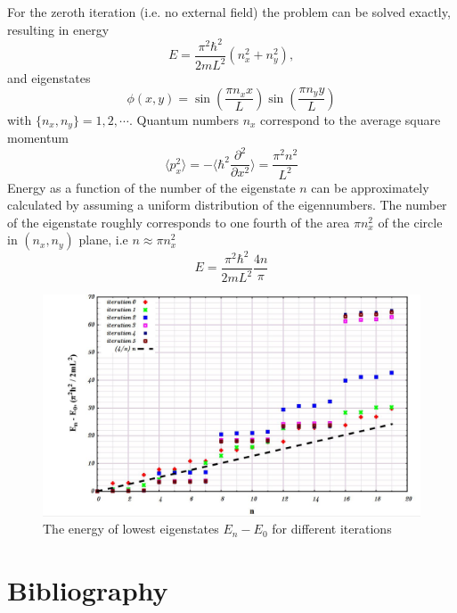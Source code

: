 \documentclass[aps,prl,reprint,onecolumn,superscriptaddress,floatfix,longbibliography]{revtex4-2}
\begin{document}
For the zeroth iteration (i.e. no external field) the problem can be solved exactly, resulting in energy
\begin{equation}
E = \frac{\pi^2\hbar^2}{2mL^2}(n_x^2+n_y^2),
\end{equation}
and eigenstates
\begin{equation}
\phi(x,y) = \sin\left(\frac{\pi n_x x}{L}\right)\sin\left(\frac{\pi n_y y}{L}\right)
\end{equation}
with $\{n_x,n_y\}=1,2,\cdots$. 
Quantum numbers $n_x$ correspond to the average square momentum
\begin{equation}
\langle p_x^2\rangle 
= 
-\langle \hbar^2 \frac{\partial^2}{\partial x^2}\rangle 
= \frac{\pi^2 n^2}{L^2}
\end{equation}
Energy as a function of the number of the eigenstate $n$ can be approximately calculated by assuming a uniform distribution of the eigennumbers. 
The number of the eigenstate roughly corresponds to one fourth of the area $\pi n_x^2$ of the circle in $(n_x, n_y)$ plane, i.e $n\approx \pi n_x^2$
\begin{equation}
E = \frac{\pi^2\hbar^2}{2mL^2} \frac{4n}{\pi}
\label{Eq:E:zbc}
\end{equation}

\begin{figure}[h!]
    \centering
    \includegraphics[scale=0.5]{./images/FigEiter.jpg}
    \caption{The energy of lowest eigenstates $E_n-E_0$ for different iterations
    }
    \label{figure:IPR}
\end{figure}







\section{Bibliography}

\end{document}
